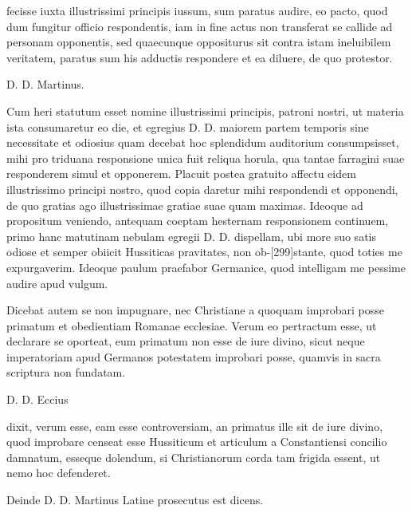 fecisse iuxta illustrissimi principis iussum, sum paratus audire, eo pacto, quod dum fungitur officio respondentis, iam in fine actus non transferat se callide ad personam opponentis, sed quaecunque oppositurus sit contra istam ineluibilem veritatem, paratus sum his adductis respondere et ea diluere, de quo protestor.

D. D. Martinus.

Cum heri statutum esset nomine illustrissimi principis, patroni nostri, ut materia ista consumaretur eo die, et egregius D. D. maiorem partem temporis sine necessitate et odiosius quam decebat hoc splendidum auditorium consumpsisset, mihi pro triduana responsione unica fuit reliqua horula, qua tantae farragini suae responderem simul et opponerem. Placuit postea gratuito affectu eidem illustrissimo principi nostro, quod copia daretur mihi respondendi et opponendi, de quo gratias ago illustrissimae gratiae suae quam maximas. Ideoque ad propositum veniendo, antequam coeptam hesternam responsionem continuem, primo hanc matutinam nebulam egregii D. D. dispellam, ubi more suo satis odiose et semper obiicit Hussiticas pravitates, non ob-[299]stante, quod toties me expurgaverim. Ideoque paulum praefabor Germanice, quod intelligam me pessime audire apud vulgum.

Dicebat autem se non impugnare, nec Christiane a quoquam improbari posse primatum et obedientiam Romanae ecclesiae. Verum eo pertractum esse, ut declarare se oporteat, eum primatum non esse de iure divino, sicut neque imperatoriam apud Germanos potestatem improbari posse, quamvis in sacra scriptura non fundatam.

D. D. Eccius

dixit, verum esse, eam esse controversiam, an primatus ille sit de iure divino, quod improbare censeat esse Hussiticum et articulum a Constantiensi concilio damnatum, esseque dolendum, si Christianorum corda tam frigida essent, ut nemo hoc defenderet.

Deinde D. D. Martinus Latine prosecutus est dicens.

